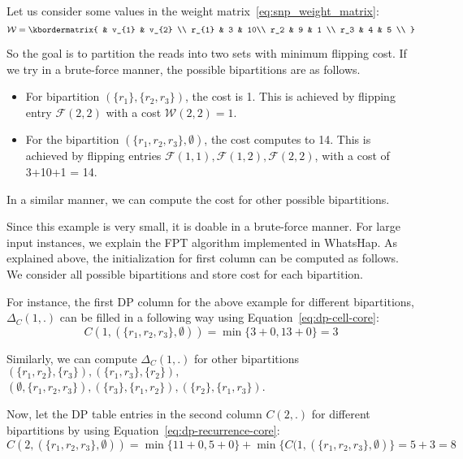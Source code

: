 Let us consider some values in the weight matrix~\eqref{eq:snp_weight_matrix}:
\begin{equation}\label{eq:snp_weight_matrix1}
  \mathcal{W}  = \kbordermatrix{
     & v_{1}       & v_{2}  \\
    r_{1}       & 3 &  10\\
    r_2 & 9 & 1 \\
    r_3 & 4 & 5 \\
  }
\end{equation}

So the goal is to partition the reads into two sets with minimum flipping cost. If we try in a brute-force manner, the possible bipartitions are as follows.

\begin{itemize}
 \item For bipartition $(\{r_1\}, \{r_2, r_3\})$, the cost is 1. This is achieved by flipping entry $\mathcal{F}(2,2)$ with a cost $\mathcal{W}(2,2) = 1$.
 \item For the bipartition $(\{r_1, r_2, r_3\}, \emptyset)$, the cost computes to 14. This is achieved by flipping entries $\mathcal{F}(1,1), \mathcal{F}(1,2), \mathcal{F}(2,2)$, with a cost of 3+10+1 = 14.
\end{itemize}

In a similar manner, we can compute the cost for other possible bipartitions.

Since this example is very small, it is doable in a brute-force manner. For large input instances, we explain the FPT algorithm implemented in WhatsHap.
As explained above, the initialization for first column can be computed as follows. 
We consider all possible bipartitions and store cost for each bipartition.

For instance, the first DP column for the above example for different bipartitions, $\Delta_C(1,.)$ can be filled in a following way using Equation~\eqref{eq:dp-cell-core}:
\[C(1, (\{r_1,r_2,r_3\},\emptyset)) =\min\{3+0,13+0\} = 3\]

Similarly, we can compute $\Delta_C(1,.)$ for other bipartitions $(\{r_1,r_2\},\{r_3\}),(\{r_1,r_3\},\{r_2\}),$\\
$(\emptyset,\{r_1,r_2,r_3\}), (\{r_3\},\{r_1,r_2\}), (\{r_2\},\{r_1,r_3\})$.

Now, let the DP table entries in the second column $C(2,.)$ for different bipartitions by using Equation~\eqref{eq:dp-recurrence-core}:
\[C(2, (\{r_1,r_2,r_3\},\emptyset)) = \min\{11+0, 5+0\}  + \min\{C(1, (\{r_1,r_2,r_3\},\emptyset)\} = 5+3 = 8 \]

